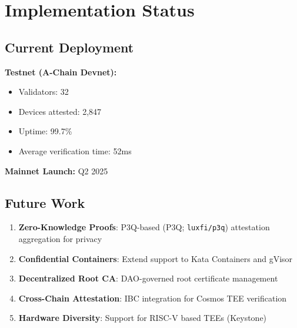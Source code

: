 \section{Implementation Status}


\subsection{Current Deployment}

\textbf{Testnet (A-Chain Devnet):}
\begin{itemize}
\item Validators: 32
\item Devices attested: 2,847
\item Uptime: 99.7\%
\item Average verification time: 52ms
\end{itemize}

\textbf{Mainnet Launch:} Q2 2025

\subsection{Future Work}

\begin{enumerate}
\item \textbf{Zero-Knowledge Proofs}: P3Q-based (P3Q; \texttt{luxfi/p3q}) attestation aggregation for privacy
\item \textbf{Confidential Containers}: Extend support to Kata Containers and gVisor
\item \textbf{Decentralized Root CA}: DAO-governed root certificate management
\item \textbf{Cross-Chain Attestation}: IBC integration for Cosmos TEE verification
\item \textbf{Hardware Diversity}: Support for RISC-V based TEEs (Keystone)
\end{enumerate}

